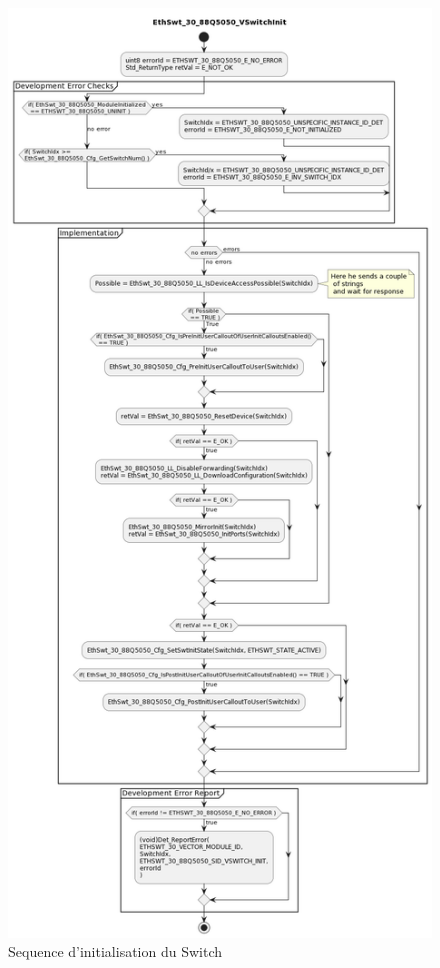 \begin{figure}[!htb]
 \centering
 \includegraphics[height=0.9\textheight]{img/EthSwt_30_88Q5050_VSwitchInit.png}
 \caption{Sequence d'initialisation du Switch}
 \label{fig:switch-init}
\end{figure}